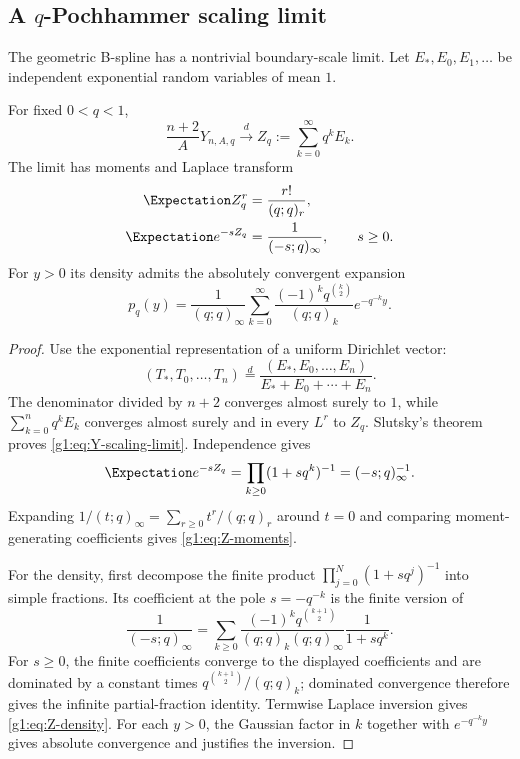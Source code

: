 \subsection{A $q$-Pochhammer scaling limit}

The geometric B-spline has a nontrivial boundary-scale limit.  Let
$E_*,E_0,E_1,\ldots$ be independent exponential random variables of mean $1$.

\begin{theorem}
For fixed $0<q<1$,
\begin{equation}
 \frac{n+2}{A}Y_{n,A,q}
 \xrightarrow{\ d\ }
 Z_q:=\sum_{k=0}^{\infty}q^kE_k.
 \label{g1:eq:Y-scaling-limit}
\end{equation}
The limit has moments and Laplace transform
\begin{align}
 \Expectation Z_q^r&=\frac{r!}{(q;q)_r},
 \label{g1:eq:Z-moments}\\
 \Expectation e^{-sZ_q}&=\frac1{(-s;q)_\infty},\qquad s\ge0.
 \label{g1:eq:Z-Laplace}
\end{align}
For $y>0$ its density admits the absolutely convergent expansion
\begin{equation}
 p_q(y)=\frac1{(q;q)_\infty}
 \sum_{k=0}^{\infty}
 \frac{(-1)^kq^{\binom{k}{2}}}{(q;q)_k}
 e^{-q^{-k}y}.
 \label{g1:eq:Z-density}
\end{equation}
\end{theorem}

\begin{proof}
Use the exponential representation of a uniform Dirichlet vector:
\[
 (T_*,T_0,\ldots,T_n)
 \overset d=
 \frac{(E_*,E_0,\ldots,E_n)}{E_*+E_0+\cdots+E_n}.
\]
The denominator divided by $n+2$ converges almost surely to $1$, while
$\sum_{k=0}^nq^kE_k$ converges almost surely and in every $L^r$ to $Z_q$.
Slutsky's theorem proves \eqref{g1:eq:Y-scaling-limit}.  Independence gives
\[
 \Expectation e^{-sZ_q}=\prod_{k\ge0}(1+sq^k)^{-1}=(-s;q)_\infty^{-1}.
\]
Expanding $1/(t;q)_\infty=\sum_{r\ge0}t^r/(q;q)_r$ around $t=0$ and comparing
moment-generating coefficients gives \eqref{g1:eq:Z-moments}.

For the density, first decompose the finite product
$\prod_{j=0}^{N}(1+sq^j)^{-1}$ into simple fractions.  Its coefficient at the
pole $s=-q^{-k}$ is the finite version of
\[
 \frac1{(-s;q)_\infty}
 =\sum_{k\ge0}
 \frac{(-1)^kq^{\binom{k+1}{2}}}
 {(q;q)_k(q;q)_\infty}\frac1{1+sq^k}.
\]
For $s\ge0$, the finite coefficients converge to the displayed coefficients
and are dominated by a constant times
$q^{\binom{k+1}{2}}/(q;q)_k$; dominated convergence therefore gives the
infinite partial-fraction identity.  Termwise Laplace inversion gives
\eqref{g1:eq:Z-density}.  For each $y>0$, the Gaussian factor in $k$ together with
$e^{-q^{-k}y}$ gives absolute convergence and justifies the inversion.
\end{proof}

